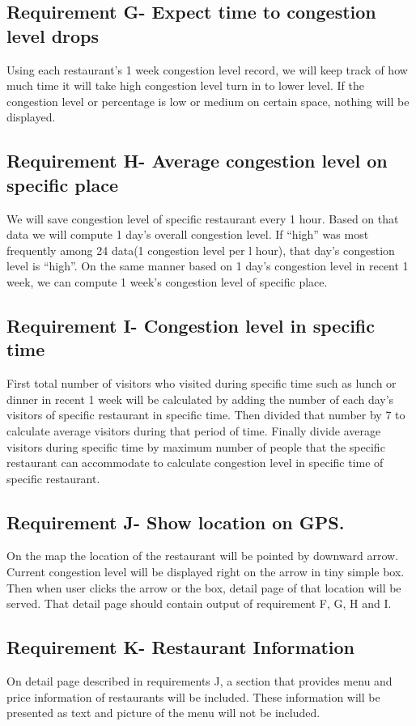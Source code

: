 \documentclass[journal]{IEEEtran}
\begin{document}
\subsection{Requirement G- Expect time to congestion level drops}
Using each restaurant’s 1 week congestion level record, we will keep track of how much time it will take high congestion level turn in to lower level. If the congestion level or percentage is low or medium on certain space, nothing will be displayed.
\subsection{Requirement H- Average congestion level on specific place}
We will save congestion level of specific restaurant every 1 hour. Based on that data we will compute 1 day’s overall congestion level. If “high” was most frequently among 24 data(1 congestion level per l hour), that day’s congestion level is “high”. On the same manner based on 1 day’s congestion level in recent 1 week, we can compute 1 week’s congestion level of specific place.
\subsection{Requirement I- Congestion level in specific time}
First total number of visitors who visited during specific time such as lunch or dinner in recent 1 week will be calculated by adding the number of each day’s visitors of specific restaurant in specific time. Then divided that number by 7 to calculate average visitors during that  period of time. Finally divide average visitors during specific time by maximum number of people that the specific restaurant can accommodate to calculate congestion level in specific time of specific restaurant.
\subsection{Requirement J- Show location on GPS.}
On the map the location of the restaurant will be pointed by downward arrow. Current congestion level will be displayed right on the arrow in tiny simple box. Then when user clicks the arrow or the box, detail page of that location will be served. That detail page should contain output of requirement F, G, H and I.
\subsection{Requirement K- Restaurant Information}
On detail page described in requirements J, a section that provides menu and price information of restaurants will be included. These information will be presented as text and picture of the menu will not be included.
\end{document}

